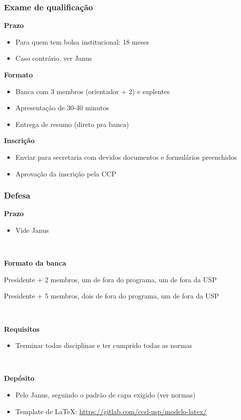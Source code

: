 \documentclass{beamer}
\begin{document}
\begin{frame}
  \frametitle{Exame de qualificação}

  \textbf{Prazo}
  \begin{itemize}
    \item Para quem tem bolsa institucional: 18 meses
    \item Caso contrário, ver Janus
  \end{itemize}\pause

  \textbf{Formato}
  \begin{itemize}
    \item Banca com 3 membros (orientador + 2) e suplentes
    \item Apresentação de 30-40 minutos
    \item Entrega de resumo (direto pra banca)
  \end{itemize}\pause

  \textbf{Inscrição}
  \begin{itemize}
    \item Enviar para secretaria com devidos documentos e formulários preenchidos
    \item Aprovação da inscrição pela CCP
  \end{itemize}
\end{frame}

\begin{frame}
  \frametitle{Defesa}

  \textbf{Prazo}
  \begin{itemize}
    \item Vide Janus
  \end{itemize}~\\\pause

  \textbf{Formato da banca}
  \begin{description}[Doutorado]
    \item[Mestrado:] Presidente + 2 membros, um de fora do programa, um de fora da USP
    \item[Doutorado:] Presidente + 5 membros, dois de fora do programa, um de fora da USP
  \end{description}~\\\pause

  \textbf{Requisitos}
  \begin{itemize}
    \item Terminar todas disciplinas e ter cumprido todas as normas
  \end{itemize}~\\\pause

  \textbf{Depósito}
  \begin{itemize}
    \item Pelo Janus, seguindo o padrão de capa exigido (ver normas)
    \item Template de \LaTeX: {\scriptsize\url{https://gitlab.com/ccsl-usp/modelo-latex/}}
  \end{itemize}
\end{frame}
\end{document}
